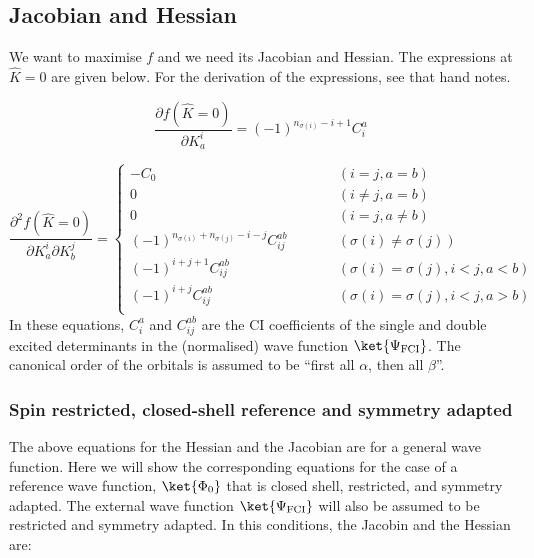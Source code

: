 \documentclass[a4paper,11pt]{article}
\begin{document}
\subsection{Jacobian and Hessian}

We want to maximise $f$ and we need its Jacobian and Hessian.
The expressions at $\hat{K} = 0$ are given below.
For the derivation of the expressions, see that hand notes.

\begin{equation}
  \frac{\partial f(\hat{K} = 0)}{\partial K_a^i} = (-1)^{n_{\sigma(i)} - i + 1} C_i^a
\end{equation}

\begin{equation}
  \frac{\partial^2 f(\hat{K} = 0)}{\partial K_a^i \partial K_b^j} =
  \left\{
    \begin{array}{lcr}
      -C_0 & \quad\quad & (i = j, a = b)\\
      0   &  \quad\quad & (i \ne j, a = b)\\
      0   &  \quad\quad & (i = j, a \ne b)\\
      (-1)^{n_{\sigma(i)}+n_{\sigma(j)}-i-j}C_{ij}^{ab} & \quad\quad & (\sigma(i) \ne \sigma(j))\\
      (-1)^{i+j+1}C_{ij}^{ab} & \quad\quad & (\sigma(i) = \sigma(j), i<j, a<b)\\
      (-1)^{i+j}C_{ij}^{ab} & \quad\quad & (\sigma(i) = \sigma(j), i<j, a>b)\\
    \end{array}
  \right.
\end{equation}
In these equations, $C_i^a$ and $C_{ij}^{ab}$ are the CI coefficients of the single and double excited determinants in the (normalised) wave function $\ket{\Psi_\text{FCI}}$.
The canonical order of the orbitals is assumed to be ``first all $\alpha$, then all $\beta$''.

\subsubsection{Spin restricted, closed-shell reference and symmetry adapted}

The above equations for the Hessian and the Jacobian are for a general wave function.
Here we will show the corresponding equations for the case of a reference wave function, $\ket{\Phi_0}$ that is closed shell, restricted, and symmetry adapted.
The external wave function $\ket{\Psi_\text{FCI}}$ will also be assumed to be restricted and symmetry adapted.
In this conditions, the Jacobin and the Hessian are:
\end{document}
